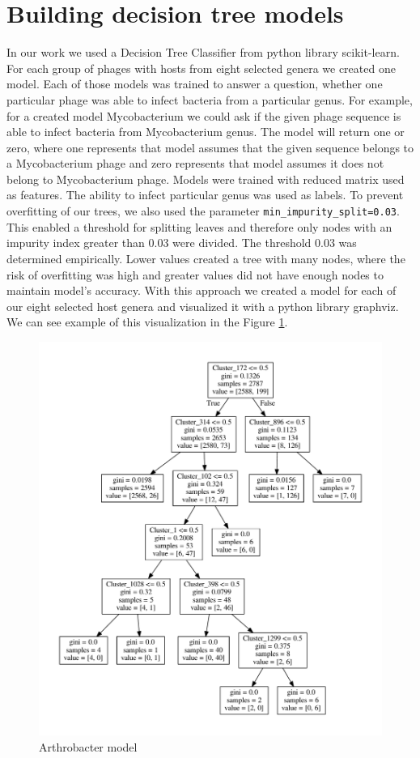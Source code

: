 \section{Building decision tree models}
In our work we used a Decision Tree Classifier from python library scikit-learn.
For each group of phages with hosts from eight selected genera we created one model.
Each of those models was trained to answer a question, whether one particular phage was able to infect bacteria from a particular genus.
For example, for a created model Mycobacterium we could ask if the given phage sequence is able to infect bacteria from Mycobacterium genus.
The model will return one or zero, where one represents that model assumes that the given sequence belongs to a Mycobacterium phage and zero represents that model assumes it does not belong to Mycobacterium phage.
Models were trained with reduced matrix used as features.
The ability to infect particular genus was used as labels.
To prevent overfitting of our trees, we also used the parameter \verb|min_impurity_split=0.03|.
This enabled a threshold for splitting leaves and therefore only nodes with an impurity index greater than 0.03 were divided.
The threshold 0.03 was determined empirically.
Lower values created a tree with many nodes, where the risk of overfitting was high and greater values did not have enough nodes to maintain model’s accuracy.
With this approach we created a model for each of our eight selected host genera and visualized it with a python library graphviz.
We can see example of this visualization in the Figure \ref{fig:tree}.

\begin{figure}[htp]
\includegraphics[width=\linewidth]{./images/tree.pdf}
\centering
\caption{Arthrobacter model}
\label{fig:tree}
\end{figure}


